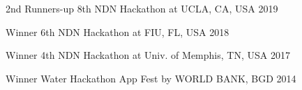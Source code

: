 



\begin{cvhonors}

  \cvhonor
    {2nd Runners-up} %
    {8th NDN Hackathon at UCLA, CA, USA} %
    {2019} %

  \cvhonor
    {Winner} %
    {6th NDN Hackathon at FIU, FL, USA} %
    {2018} %

  \cvhonor
    {Winner} %
    {4th NDN Hackathon at Univ. of Memphis, TN, USA} %
    {2017} %



  \cvhonor
    {Winner} %
    {Water Hackathon App Fest by WORLD BANK, BGD} %
    {2014} %



\end{cvhonors}


